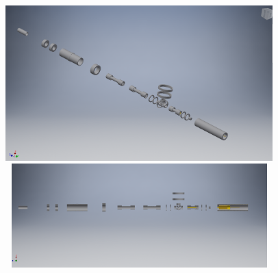 \documentclass{article}
\begin{document}
\begin{figure}[h]
\centering
\includegraphics[width=120mm, height=60mm]{full-beam-line}
\\

\includegraphics[width=120mm,
height=40mm]{full-beam-line-half}
\end{figure}
\end{document}
